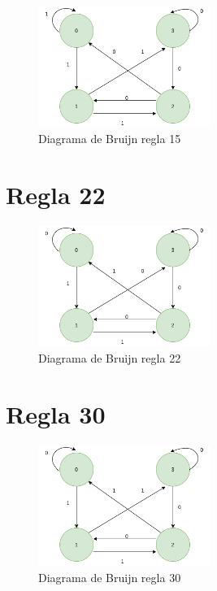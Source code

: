 \begin{figure}[h]
	\centering
	\includegraphics[width=0.5\textwidth]{capitulo1/images/rule15.png}
	\caption{Diagrama de Bruijn regla 15}
	\label{fig:rule15}
\end{figure}

\section{Regla 22}


\begin{figure}[h]
	\centering
	\includegraphics[width=0.5\textwidth]{capitulo1/images/rule22.png}
	\caption{Diagrama de Bruijn regla 22}
	\label{fig:rule22}
\end{figure}

\section{Regla 30}


\begin{figure}[h]
	\centering
	\includegraphics[width=0.5\textwidth]{capitulo1/images/rule30.png}
	\caption{Diagrama de Bruijn regla 30}
	\label{fig:rule30}
\end{figure}
